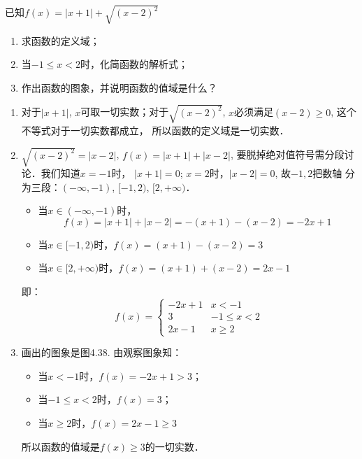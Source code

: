 \begin{example}
    已知$f(x)=|x+1|+\sqrt{(x-2)^2}$
\begin{enumerate}
    \item 求函数的定义域；
    \item 当$-1\le x<2$时，化简函数的解析式；
    \item 作出函数的图象，并说明函数的值域是什么？
\end{enumerate}
\end{example}    

\begin{solution}
\begin{enumerate}
    \item 对于$|x+1|$, $x$可取一切实数；对于$\sqrt{(x-2)^2}$,
    $x$必须满足$(x-2)\ge 0$, 这个不等式对于一切实数都成立，
    所以函数的定义域是一切实数．
\item $\sqrt{(x-2)^2}=|x-2|$, $f(x)=|x+1|+|x-2|$,
    要脱掉绝对值符号需分段讨论．我们知道$x=-1$时，
    $|x+1|=0$; $x=2$时，$|x-2|=0$, 故$-1,2$把数轴
    分为三段：$(-\infty,-1)$, $[-1,2)$, $[2,+\infty)$．
\begin{itemize}
    \item 当$x\in (-\infty,-1)$时，
    $$f(x)=|x+1|+|x-2|=-(x+1)-(x-2)=-2x+1$$
    \item 当$x\in[-1,2)$时，$f(x)=(x+1)-(x-2)=3$
  \item   当$x\in [2,+\infty)$时，$f(x)=(x+1)+(x-2)=2x-1$
\end{itemize}
即：\[f(x)=\begin{cases}
   -2x+1  & x<-1\\
   3& -1\le x<2\\
   2x-1 & x\ge 2 
\end{cases}\]
\item 画出的图象是图4.38.
由观察图象知：
\begin{itemize}
    \item 当$x<-1$时，$f(x)=-2x+1>3$；
    \item 当$-1\le x<2$时，$f(x)=3$；
    \item 当$x\ge 2$时，$f(x)=2x-1\ge 3$
\end{itemize}
所以函数的值域是$f(x)\ge 3$的一切实数．
\end{enumerate}

\begin{figure}[htp]
    \centering
{}
    \caption{}
\end{figure}


\end{solution}

